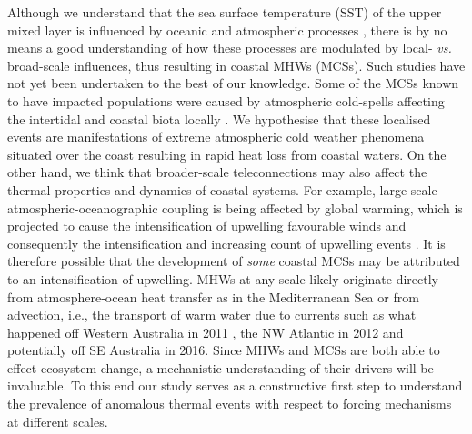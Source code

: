 \documentclass[a4paper,10pt,review]{elsarticle}
\begin{document}
Although we understand that the sea surface temperature (SST) of the upper mixed layer is influenced by oceanic and atmospheric processes \citep[see Equation 1 of][]{Deser2010}, there is by no means a good understanding of how these processes are modulated by local- \emph{vs.} broad-scale influences, thus resulting in coastal MHWs (MCSs). Such studies have not yet been undertaken to the best of our knowledge. Some of the MCSs known to have impacted populations were caused by atmospheric cold-spells affecting the intertidal and coastal biota locally \citep{Gunter1941, Firth2011}. We hypothesise that these localised events are manifestations of extreme atmospheric cold weather phenomena situated over the coast resulting in rapid heat loss from coastal waters. On the other hand, we think that broader-scale teleconnections may also affect the thermal properties and dynamics of coastal systems. For example, large-scale atmospheric-oceanographic coupling is being affected by global warming, which is projected to cause the intensification of upwelling favourable winds and consequently the intensification and increasing count of upwelling events \citep[see][for a review of this and alternative hypotheses]{Garcia-Reyes2015}. It is therefore possible that the development of \emph{some} coastal MCSs may be attributed to an intensification of upwelling. MHWs at any scale likely originate directly from atmosphere-ocean heat transfer as in the Mediterranean Sea \citep[e.g.][]{Garrabou2009} or from advection, i.e., the transport of warm water due to currents such as what happened off Western Australia in 2011 \citep{Feng2013, Benthuysen2014}, the NW Atlantic in 2012 \citep{Mills2012, Chen2014, Chen2015} and potentially off SE Australia in 2016. Since MHWs and MCSs are both able to effect ecosystem change, a mechanistic understanding of their drivers will be invaluable. To this end our study serves as a constructive first step to understand the prevalence of anomalous thermal events with respect to forcing mechanisms at different scales.
\end{document}
